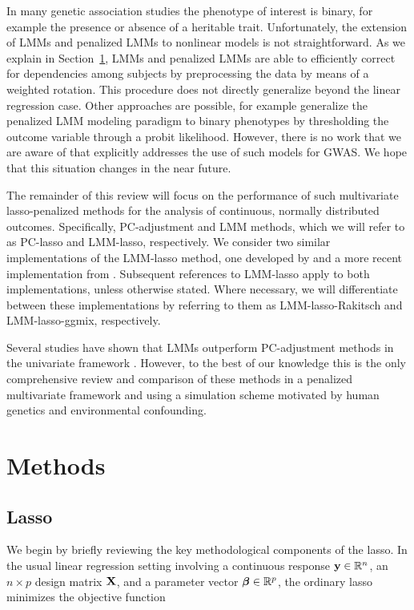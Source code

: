 In many genetic association studies the phenotype of interest is binary, for example the presence or absence of a heritable trait. Unfortunately, the extension of LMMs and penalized LMMs to nonlinear models is not straightforward. As we explain in Section~\ref{sec:methods}, LMMs and penalized LMMs are able to efficiently correct for dependencies among subjects by preprocessing the data by means of a weighted rotation. This procedure does not directly generalize beyond the linear regression case. Other approaches are possible, for example \citet{mandt2017sparse} generalize the penalized LMM modeling paradigm to binary phenotypes by thresholding the outcome variable through a probit likelihood. However, there is no work that we are aware of that explicitly addresses the use of such models for GWAS. We hope that this situation changes in the near future.

The remainder of this review will focus on the performance of such multivariate lasso-penalized methods for the analysis of continuous, normally distributed outcomes. Specifically, PC-adjustment and LMM methods, which we will refer to as PC-lasso and LMM-lasso, respectively. We consider two similar implementations of the LMM-lasso method, one developed by \citet{rakitsch2013lasso} and a more recent implementation from \citet{bhatnagar2020simultaneous}. Subsequent references to LMM-lasso apply to both implementations, unless otherwise stated. Where necessary, we will differentiate between these implementations by referring to them as LMM-lasso-Rakitsch and LMM-lasso-ggmix, respectively. 

Several studies have shown that LMMs outperform PC-adjustment methods in the univariate framework \citep{wang2013analytical, kang2010variance, zhao2007arabidopsis}. However, to the best of our knowledge this is the only comprehensive review and comparison of these methods in a penalized multivariate framework and using a simulation scheme motivated by human genetics and environmental confounding.\\

\section{Methods} \label{sec:methods}
\subsection{Lasso}
We begin by briefly reviewing the key methodological components of the lasso. In the usual linear regression setting involving a continuous response $\mathbf{y} \in \mathbb{R}^n$, an $n \times p$ design matrix $\mathbf{X}$, and a parameter vector $\boldsymbol{\beta}{} \in \mathbb{R}^p$, the ordinary lasso minimizes the objective function

